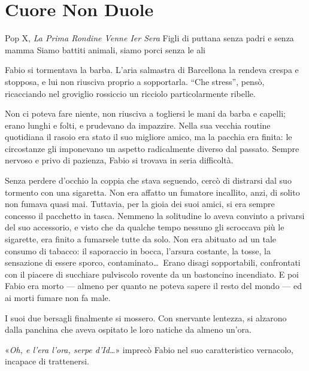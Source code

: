 \chapter{Cuore Non Duole}

\begin{chapquote}{Pop X, \textit{La Prima Rondine Venne Ier Sera}}
	Figli di puttana senza padri e senza mamma\newline
	Siamo battiti animali, siamo porci senza le ali
\end{chapquote}


Fabio si tormentava la barba. L'aria salmastra di Barcellona la rendeva crespa e stopposa, e lui non riusciva proprio a sopportarla. ``Che stress'', pensò, ricacciando nel groviglio rossiccio un ricciolo particolarmente ribelle.

Non ci poteva fare niente, non riusciva a togliersi le mani da barba e capelli; erano lunghi e folti, e prudevano da impazzire. Nella sua vecchia routine quotidiana il rasoio era stato il suo migliore amico, ma la pacchia era finita: le circostanze gli imponevano un aspetto radicalmente diverso dal passato. Sempre nervoso e privo di pazienza, Fabio si trovava in seria difficoltà.

Senza perdere d'occhio la coppia che stava seguendo, cercò di distrarsi dal suo tormento con una sigaretta. Non era affatto un fumatore incallito, anzi, di solito non fumava quasi mai. Tuttavia, per la gioia dei suoi amici, si era sempre concesso il pacchetto in tasca. Nemmeno la solitudine lo aveva convinto a privarsi del suo accessorio, e visto che da qualche tempo nessuno gli scroccava più le sigarette, era finito a fumarsele tutte da solo. Non era abituato ad un tale consumo di tabacco: il saporaccio in bocca, l'arsura costante, la tosse, la sensazione di essere sporco, contaminato\ldots\ Erano disagi sopportabili, confrontati con il piacere di succhiare pulviscolo rovente da un bastoncino incendiato. E poi Fabio era morto --- almeno per quanto ne poteva sapere il resto del mondo --- ed ai morti fumare non fa male.

I suoi due bersagli finalmente si mossero. Con snervante lentezza, si alzarono dalla panchina che aveva ospitato le loro natiche da almeno un'ora.

«\textit{Oh, e l'era l'ora, serpe d'Id\ldots}» imprecò Fabio nel suo caratteristico vernacolo, incapace di trattenersi.

